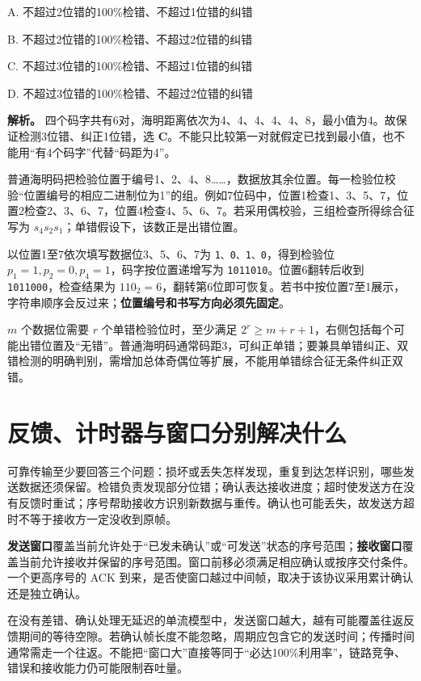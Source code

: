 A. 不超过2位错的100\%检错、不超过1位错的纠错

B. 不超过2位错的100\%检错、不超过2位错的纠错

C. 不超过3位错的100\%检错、不超过1位错的纠错

D. 不超过3位错的100\%检错、不超过2位错的纠错


\textbf{解析。} 四个码字共有6对，海明距离依次为4、4、4、4、4、8，最小值为4。故保证检测3位错、纠正1位错，选 \textbf{C}。不能只比较第一对就假定已找到最小值，也不能用``有4个码字''代替``码距为4''。

普通海明码把检验位置于编号1、2、4、8\ldots\ldots，数据放其余位置。每一检验位校验``位置编号的相应二进制位为1''的组。例如7位码中，位置1检查1、3、5、7，位置2检查2、3、6、7，位置4检查4、5、6、7。若采用偶校验，三组检查所得综合征写为 \(s_4s_2s_1\)；单错假设下，该数正是出错位置。

以位置1至7依次填写数据位3、5、6、7为 \texttt{1、0、1、0}，得到检验位 \(p_1=1,p_2=0,p_4=1\)，码字按位置递增写为 \texttt{1011010}。位置6翻转后收到 \texttt{1011000}，检查结果为 \(110_2=6\)，翻转第6位即可恢复。若书中按位置7至1展示，字符串顺序会反过来；\textbf{位置编号和书写方向必须先固定}。

\(m\) 个数据位需要 \(r\) 个单错检验位时，至少满足 \(2^r\ge m+r+1\)，右侧包括每个可能出错位置及``无错''。普通海明码通常码距3，可纠正单错；要兼具单错纠正、双错检测的明确判别，需增加总体奇偶位等扩展，不能用单错综合征无条件纠正双错。

\section{反馈、计时器与窗口分别解决什么}\label{cn-03-05}

可靠传输至少要回答三个问题：损坏或丢失怎样发现，重复到达怎样识别，哪些发送数据还须保留。检错负责发现部分位错；确认表达接收进度；超时使发送方在没有反馈时重试；序号帮助接收方识别新数据与重传。确认也可能丢失，故发送方超时不等于接收方一定没收到原帧。

\textbf{发送窗口}覆盖当前允许处于``已发未确认''或``可发送''状态的序号范围；\textbf{接收窗口}覆盖当前允许接收并保留的序号范围。窗口前移必须满足相应确认或按序交付条件。一个更高序号的 ACK 到来，是否使窗口越过中间帧，取决于该协议采用累计确认还是独立确认。

在没有差错、确认处理无延迟的单流模型中，发送窗口越大，越有可能覆盖往返反馈期间的等待空隙。若确认帧长度不能忽略，周期应包含它的发送时间；传播时间通常需走一个往返。不能把``窗口大''直接等同于``必达100\%利用率''，链路竞争、错误和接收能力仍可能限制吞吐量。


